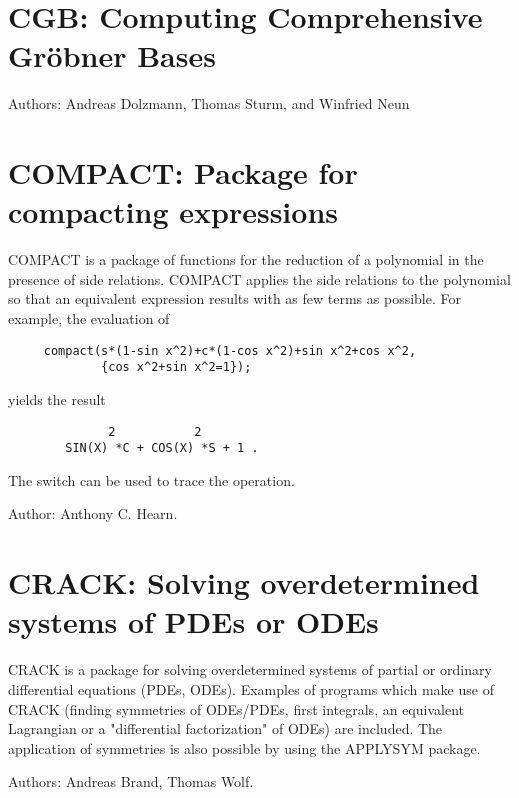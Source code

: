 

\section{CGB: Computing Comprehensive Gr\"obner Bases}

Authors: Andreas Dolzmann, Thomas Sturm, and Winfried Neun


\newpage

\section{COMPACT: Package for compacting expressions} 

COMPACT is a package of functions for the reduction of a polynomial in the
presence of side relations.  COMPACT applies the side relations to the
polynomial so that an equivalent expression results with as few terms as
possible.  For example, the evaluation of
\begin{verbatim}
     compact(s*(1-sin x^2)+c*(1-cos x^2)+sin x^2+cos x^2,
             {cos x^2+sin x^2=1});
\end{verbatim}
yields the result\pagebreak[1]
\begin{verbatim}
              2           2
        SIN(X) *C + COS(X) *S + 1 .
\end{verbatim}
The switch  can be used to trace the operation.

Author:  Anthony C. Hearn.


\newpage

\section{CRACK: Solving overdetermined systems of PDEs or ODEs}

CRACK is a package for solving overdetermined systems of partial or
ordinary differential equations (PDEs, ODEs).  Examples of programs which
make use of CRACK (finding symmetries of ODEs/PDEs, first integrals, an
equivalent Lagrangian or a "differential factorization" of ODEs) are
included.  The application of symmetries is also possible by using the
APPLYSYM package.

Authors: Andreas Brand, Thomas Wolf.

